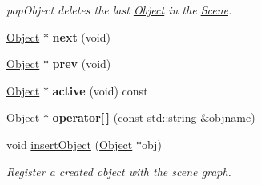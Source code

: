 \begin{DoxyCompactItemize}
\begin{DoxyCompactList}\small\item\em pop\-Object deletes the last \hyperlink{class_object}{Object} in the \hyperlink{class_scene}{Scene}. \end{DoxyCompactList}\item 
\hypertarget{class_scene_a70fcdad192a4c6ff508125de8af6cf4d}{\hyperlink{class_object}{Object} $\ast$ {\bfseries next} (void)}\label{class_scene_a70fcdad192a4c6ff508125de8af6cf4d}

\item 
\hypertarget{class_scene_ac852d5d763eb35b4908c9aa7ea54d1ae}{\hyperlink{class_object}{Object} $\ast$ {\bfseries prev} (void)}\label{class_scene_ac852d5d763eb35b4908c9aa7ea54d1ae}

\item 
\hypertarget{class_scene_ad0ea1a6bcf7815c63988bd937f06eb23}{\hyperlink{class_object}{Object} $\ast$ {\bfseries active} (void) const }\label{class_scene_ad0ea1a6bcf7815c63988bd937f06eb23}

\item 
\hypertarget{class_scene_ae9b69d8db8a46991017635f22e45baad}{\hyperlink{class_object}{Object} $\ast$ {\bfseries operator\mbox{[}$\,$\mbox{]}} (const std\-::string \&objname)}\label{class_scene_ae9b69d8db8a46991017635f22e45baad}

\item 
void \hyperlink{class_scene_a8893899f0088a72642ae32a656252e7f}{insert\-Object} (\hyperlink{class_object}{Object} $\ast$obj)
\begin{DoxyCompactList}\small\item\em Register a created object with the scene graph. \end{DoxyCompactList}\end{DoxyCompactItemize}
